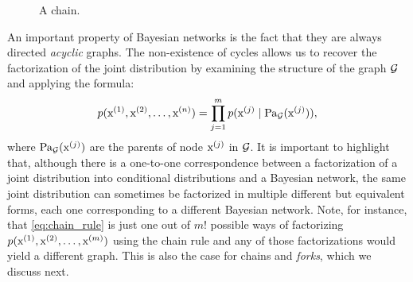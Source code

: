 \begin{figure}
    \centering
    \caption{A chain.}
    \label{fig:chain_bayesian_net}
\end{figure}
An important property of Bayesian networks is the fact that they are always directed \emph{acyclic} graphs. The non-existence of cycles allows us to recover the factorization of the joint distribution by examining the structure of the graph ${\mathcal{G}}$ and applying the formula:
\begin{equation}
    p({\textnormal{x}}^{(1)}, {\textnormal{x}}^{(2)}, \dots, {\textnormal{x}}^{(n)}) = \prod_{j=1}^m p({\textnormal{x}}^{(j)} \mid \mathrm{Pa}_{\mathcal{G}}({\textnormal{x}}^{(j)})),
\end{equation}
where $\mathrm{Pa}_{\mathcal{G}}({\textnormal{x}}^{(j)})$ are the parents of node ${\textnormal{x}}^{(j)}$ in ${\mathcal{G}}$. It is important to highlight that, although there is a one-to-one correspondence between a factorization of a joint distribution into conditional distributions and a Bayesian network, the same joint distribution can sometimes be factorized in multiple different but equivalent forms, each one corresponding to a different Bayesian network. Note, for instance, that \eqref{eq:chain_rule} is just one out of $m!$ possible ways of factorizing $p({\textnormal{x}}^{(1)},{\textnormal{x}}^{(2)},\dots,{\textnormal{x}}^{(m)})$ using the chain rule and any of those factorizations would yield a different graph. This is also the case for chains and \emph{forks}, which we discuss next.

